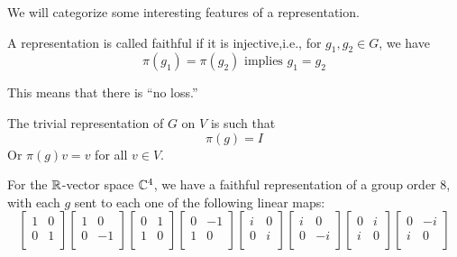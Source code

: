 We will categorize some interesting features of a representation.
\begin{definition}
    A representation is called faithful if it is injective,i.e., for $g_1, g_2\in G$, we have
    \begin{equation*}
        \pi(g_1)=\pi(g_2) \text{ implies } g_1=g_2
    \end{equation*}
\end{definition}
\begin{remark}
    This means that there is ``no loss.''
\end{remark}
\begin{definition}
    The trivial representation of $G$ on $V$ is such that 
    \begin{equation*}
        \pi(g)=I
    \end{equation*}
    Or $\pi(g)v=v$ for all $v\in V$.
\end{definition}
\begin{example}
    For the $\mathbb{R}$-vector space $\mathbb{C}^4$, we have a faithful representation of a group order 8, with each $g$ sent to each one of the following linear maps:
    \begin{equation*}
        \begin{bmatrix}
            1& 0\\
            0& 1\\
        \end{bmatrix}
        \begin{bmatrix}
            1& 0\\
            0& -1\\
        \end{bmatrix}
        \begin{bmatrix}
            0& 1\\
            1& 0\\
        \end{bmatrix}
        \begin{bmatrix}
            0& -1\\
            1& 0\\
        \end{bmatrix}
        \begin{bmatrix}
            i& 0\\
            0& i\\
        \end{bmatrix}
        \begin{bmatrix}
            i& 0\\
            0& -i\\
        \end{bmatrix}
        \begin{bmatrix}
            0& i\\
            i& 0\\
        \end{bmatrix}
        \begin{bmatrix}
            0& -i\\
            i& 0\\
        \end{bmatrix}
    \end{equation*}
\end{example}

